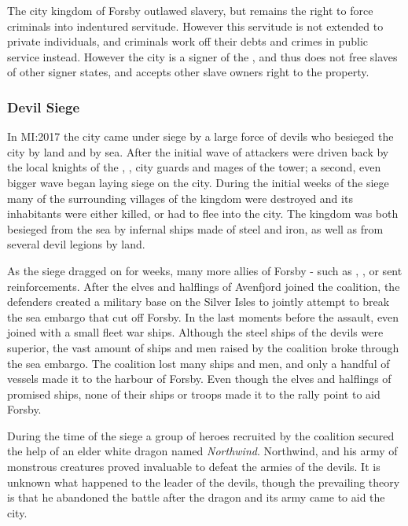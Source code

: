 The city kingdom of Forsby outlawed slavery, but remains the right to force
criminals into indentured servitude. However this servitude is not extended
to private individuals, and criminals work off their debts and crimes in public
service instead. However the city is a signer of the ,
and thus does not free slaves of other signer states, and accepts other slave
owners right to the property.

\subsubsection{Devil Siege}
\label{sec:Devil Siege}


In MI:2017 the city came under siege by a large force of devils who besieged
the city by land and by sea. After the initial wave of attackers were driven
back by the local knights of the , , city
guards and mages of the tower; a second, even bigger wave began laying siege
on the city. During the initial weeks of the siege many of the surrounding
villages of the kingdom were destroyed and its inhabitants were either killed,
or had to flee into the city. The kingdom was both besieged from the sea by
infernal ships made of steel and iron, as well as from several devil legions
by land.

As the siege dragged on for weeks, many more allies of Forsby - such as
, ,  or
 sent reinforcements. After the elves and halflings of
Avenfjord joined the coalition, the defenders created a military base on the
Silver Isles to jointly attempt to break the sea embargo that cut off
Forsby. In the last moments before the assault, even  joined
with a small fleet war ships. Although the steel ships of the devils were
superior, the vast amount of ships and men raised by the coalition broke
through the sea embargo. The coalition lost many ships and men, and only a
handful of vessels made it to the harbour of Forsby. Even though the elves and
halflings of  promised ships, none of their ships or
troops made it to the rally point to aid Forsby.

During the time of the siege a group of heroes recruited by the coalition
secured the help of an elder white dragon named \emph{Northwind}. Northwind,
and his army of monstrous creatures proved invaluable to defeat the armies of
the devils. It is unknown what happened to the leader of the devils, though
the prevailing theory is that he abandoned the battle after the dragon and its
army came to aid the city.

